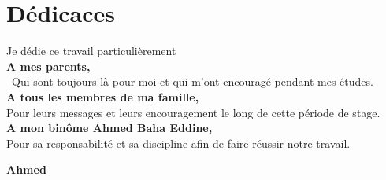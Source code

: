 \chapter*{\centering Dédicaces }

\begin{center}
	
	\begin{minipage}[c]{1\columnwidth}
		
		{\large 
			\vskip1cm
			
			\centering
			Je dédie ce travail particulièrement \\\vskip0.5cm\textbf{A mes parents,}\\\ Qui sont toujours là pour moi et qui m'ont encouragé pendant mes études.\\ \vskip0.5cm
			\textbf{A tous les membres de ma famille,}\\Pour leurs messages et leurs encouragement le long de cette période de stage.\\ \vskip0.5cm
			\textbf{A mon binôme Ahmed Baha Eddine,}\\
			Pour sa responsabilité et sa discipline afin de faire réussir notre travail.
		}
		
		
	\end{minipage}
	
\end{center}

\vskip1.5cm
\begin{flushright}\LARGE
	\bf{Ahmed}
\end{flushright}
